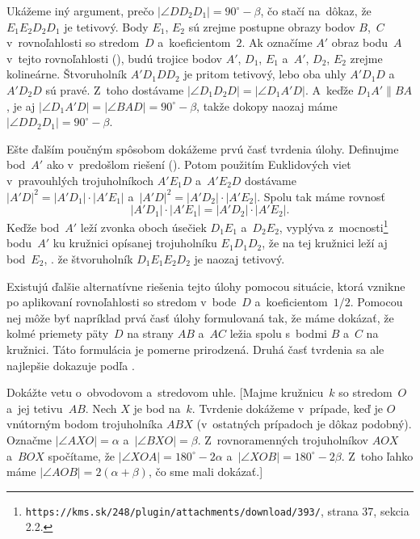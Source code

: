 {\ineres
Ukážeme iný argument, prečo $|\angle DD_2D_1| = 90^\circ- \beta$, čo
stačí na~dôkaz, že $E_1E_2D_2D_1$ je tetivový.
Body $E_1$, $E_2$ sú zrejme postupne obrazy bodov $B$,~$C$
v~rovnoľahlosti so stredom~$D$ a~koeficientom~$2$. Ak označíme $A'$
obraz bodu~$A$ v~tejto rovnoľahlosti (\obr), budú trojice bodov
%
$A'$, $D_1$, $E_1$ a~$A'$, $D_2$, $E_2$ zrejme kolineárne. Štvoruholník
$A'D_1DD_2$ je pritom tetivový, lebo oba uhly $A'D_1D$ a~$A'D_2D$
sú pravé. Z~toho dostávame $|\angle D_1D_2D| = |\angle D_1A'D|$.
A~keďže $D_1A'\parallel BA$, je aj $|\angle D_1A'D| = |\angle
BAD| = 90^\circ- \beta$, takže dokopy naozaj máme $|\angle
DD_2D_1| = 90^\circ- \beta$.

\ineres
Ešte ďalším poučným spôsobom dokážeme prvú časť tvrdenia úlohy.
Definujme bod~$A'$ ako v~predošlom riešení ().
Potom použitím Euklidových viet v~pravouhlých trojuholníkoch
$A'E_1D$ a~$A'E_2D$ dostávame $|A'D|^2 = |A'D_1| \cdot |A'E_1|$
a~$|A'D|^2 = |A'D_2| \cdot |A'E_2|$. Spolu tak máme rovnosť
$$
|A'D_1|\cdot |A'E_1| = |A'D_2| \cdot |A'E_2|.
$$
Keďže bod~$A'$ leží zvonka oboch úsečiek $D_1E_1$ a~$D_2E_2$,
vyplýva z~mocnosti\footnote{{\tt https://kms.sk/248/plugin/attachments/download/393/},
strana 37, sekcia 2.2.} bodu~$A'$ ku kružnici opísanej trojuholníku $E_1D_1D_2$, že na tej
kružnici leží aj bod~$E_2$, \tj. že štvoruholník $D_1E_1E_2D_2$ je naozaj tetivový.

\poznamka
Existujú ďalšie alternatívne
riešenia tejto úlohy pomocou situácie, ktorá vznikne po aplikovaní
rovnoľahlosti so stredom v~bode~$D$ a~koeficientom~$1/2$. Pomocou nej môže
byť napríklad prvá časť úlohy formulovaná tak, že máme dokázať, že
kolmé priemety päty~$D$ na strany $AB$ a~$AC$ ležia spolu s~bodmi $B$ a~$C$ na
kružnici. Táto formulácia je pomerne prirodzená.
Druhá časť tvrdenia sa ale najlepšie dokazuje podľa .



Dokážte vetu o~obvodovom a~stredovom uhle. [Majme
kružnicu~$k$ so stredom~$O$ a~jej tetivu~$AB$. Nech $X$ je bod na~$k$.
Tvrdenie dokážeme v~prípade, keď je $O$ vnútorným bodom
trojuholníka $ABX$ (v~ostatných prípadoch je dôkaz podobný).
Označme $|\angle AXO| = \alpha$ a~$|\angle BXO| = \beta$.
Z~rovnoramenných trojuholníkov $AOX$ a~$BOX$ spočítame, že $|\angle
XOA| = 180^\circ-2\alpha$ a~$|\angle XOB| = 180^\circ-2\beta$.
Z~toho ľahko máme $|\angle AOB| = 2(\alpha+\beta)$, čo sme mali
dokázať.]

}

